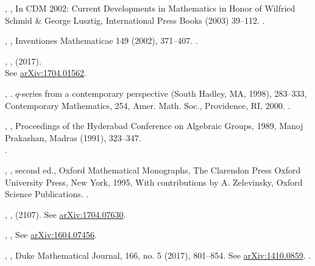 \documentclass[12pt]{amsart}
\theoremstyle{plain}
\theoremstyle{definition}
\theoremstyle{remark}
\begin{document}
\begin{thebibliography}{10}
,
,  
In CDM 2002: Current Developments in Mathematics in Honor of  Wilfried Schmid \& George Lusztig, 
International Press Books  (2003) 39--112. . 

, 
, 
Inventiones Mathematicae 149 (2002), 371--407. .


,
, (2017).\\
See \href{http://arxiv.org/abs/arXiv:1704.01562}{arXiv:1704.01562}.

,
.
$q$-series from a contemporary perspective (South Hadley, MA, 1998), 283--333, 
Contemporary Mathematics, 254, Amer. Math. Soc., Providence, RI, 2000. .


,
, 
Proceedings of the Hyderabad Conference on Algebraic Groups, 1989, Manoj Prakashan, Madras (1991), 323--347. \\
.


,
, second ed., Oxford
Mathematical Monographs, The Clarendon Press Oxford University Press, New York, 1995, 
With contributions by A. Zelevinsky, Oxford Science Publications. .
  
 ,
 , (2107).
 See \href{http://arxiv.org/abs/arXiv:1704.07630}{arXiv:1704.07630}.
 
 
  ,
  ,
See \href{http://arxiv.org/abs/arXiv:1604.07456}{arXiv:1604.07456}.

,
, 	
Duke Mathematical Journal,  166, no. 5 (2017), 801--854.
See \href{http://arxiv.org/abs/1410.0859}{arXiv:1410.0859}.  .




\end{thebibliography}
\end{document}

